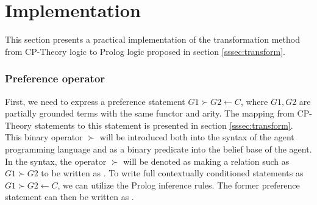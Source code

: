 

\section{Implementation\label{sec:implementation}}

This section presents a practical implementation
of the transformation method from CP-Theory logic to Prolog logic proposed in section \ref{sssec:transform}. 

\subsubsection*{Preference operator}
First, we need to express a preference statement $G1 \succ G2 \leftarrow C$, where $G1,G2$ are partially grounded terms with the same functor and arity. The mapping from CP-Theory statements to this statement is presented in section \ref{sssec:transform}. This binary operator $\succ$ will be introduced both into the syntax of the agent programming language and as a binary predicate into the belief base of the agent. In the syntax, the operator $\succ$ will be denoted as \asc{>>} making a relation such as $G1 \succ G2$ to be written as .
To write full contextually conditioned statements as $G1 \succ G2 \leftarrow C$, we can utilize the Prolog inference rules. The former preference statement can then be written as . %


